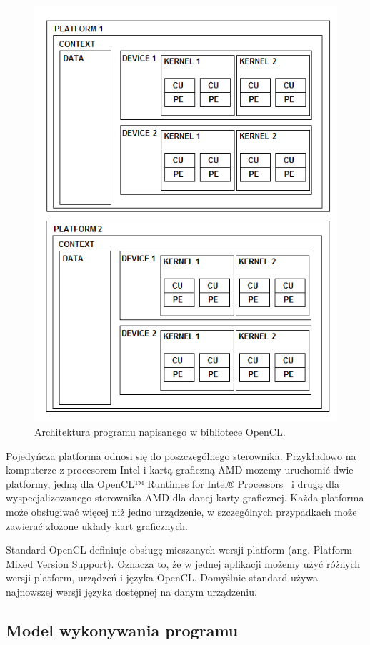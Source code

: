 \begin{figure}[h]
        \centering
                \centering
                \includegraphics[width=12cm]{rys8}
	\caption{Architektura programu napisanego w bibliotece OpenCL.}
\end{figure}

Pojedyńcza platforma odnosi się do poszczególnego sterownika. Przykładowo na komputerze z procesorem Intel i kartą graficzną AMD mozemy uruchomić dwie platformy, jedną dla OpenCL™ Runtimes for Intel® Processors~\cite{b22} i drugą dla wyspecjalizowanego sterownika AMD dla danej karty graficznej. Każda platforma może obsługiwać więcej niż jedno urządzenie, w szczególnych przypadkach może zawierać złożone układy kart graficznych. 

Standard OpenCL definiuje obsługę mieszanych wersji platform (ang. Platform Mixed Version Support). Oznacza to, że w jednej aplikacji możemy użyć różnych wersji platform, urządzeń i języka OpenCL. Domyślnie standard używa najnowszej wersji języka dostępnej na danym urządzeniu.

\subsection{Model wykonywania programu}\label{sec:mwp}

